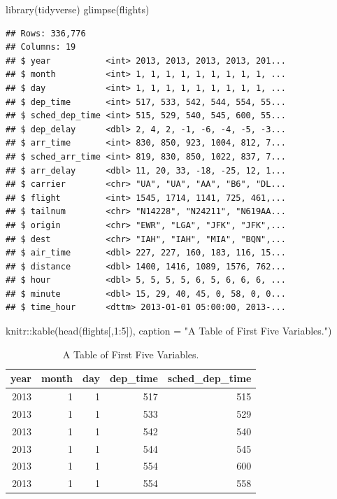 \documentclass[
]{book}
\newenvironment{Shaded}{\begin{snugshade}}{\end{snugshade}}
\newcommand{\AttributeTok}[1]{\textcolor[rgb]{0.77,0.63,0.00}{#1}}
\newcommand{\DecValTok}[1]{\textcolor[rgb]{0.00,0.00,0.81}{#1}}
\newcommand{\FunctionTok}[1]{\textcolor[rgb]{0.00,0.00,0.00}{#1}}
\newcommand{\NormalTok}[1]{#1}
\newcommand{\SpecialCharTok}[1]{\textcolor[rgb]{0.00,0.00,0.00}{#1}}
\newcommand{\StringTok}[1]{\textcolor[rgb]{0.31,0.60,0.02}{#1}}
\begin{document}
\begin{Shaded}
\begin{Highlighting}[]
\FunctionTok{library}\NormalTok{(tidyverse)}
\FunctionTok{glimpse}\NormalTok{(flights)}
\end{Highlighting}
\end{Shaded}

\begin{verbatim}
## Rows: 336,776
## Columns: 19
## $ year           <int> 2013, 2013, 2013, 2013, 201...
## $ month          <int> 1, 1, 1, 1, 1, 1, 1, 1, 1, ...
## $ day            <int> 1, 1, 1, 1, 1, 1, 1, 1, 1, ...
## $ dep_time       <int> 517, 533, 542, 544, 554, 55...
## $ sched_dep_time <int> 515, 529, 540, 545, 600, 55...
## $ dep_delay      <dbl> 2, 4, 2, -1, -6, -4, -5, -3...
## $ arr_time       <int> 830, 850, 923, 1004, 812, 7...
## $ sched_arr_time <int> 819, 830, 850, 1022, 837, 7...
## $ arr_delay      <dbl> 11, 20, 33, -18, -25, 12, 1...
## $ carrier        <chr> "UA", "UA", "AA", "B6", "DL...
## $ flight         <int> 1545, 1714, 1141, 725, 461,...
## $ tailnum        <chr> "N14228", "N24211", "N619AA...
## $ origin         <chr> "EWR", "LGA", "JFK", "JFK",...
## $ dest           <chr> "IAH", "IAH", "MIA", "BQN",...
## $ air_time       <dbl> 227, 227, 160, 183, 116, 15...
## $ distance       <dbl> 1400, 1416, 1089, 1576, 762...
## $ hour           <dbl> 5, 5, 5, 5, 6, 5, 6, 6, 6, ...
## $ minute         <dbl> 15, 29, 40, 45, 0, 58, 0, 0...
## $ time_hour      <dttm> 2013-01-01 05:00:00, 2013-...
\end{verbatim}

\begin{Shaded}
\begin{Highlighting}[]
\NormalTok{knitr}\SpecialCharTok{::}\FunctionTok{kable}\NormalTok{(}\FunctionTok{head}\NormalTok{(flights[,}\DecValTok{1}\SpecialCharTok{:}\DecValTok{5}\NormalTok{]), }\AttributeTok{caption =} \StringTok{"A Table of First Five Variables."}\NormalTok{)}
\end{Highlighting}
\end{Shaded}

\begin{table}

\caption{\label{tab:tab1}A Table of First Five Variables.}
\centering
\begin{tabular}[t]{r|r|r|r|r}
\hline
year & month & day & dep\_time & sched\_dep\_time\\
\hline
2013 & 1 & 1 & 517 & 515\\
\hline
2013 & 1 & 1 & 533 & 529\\
\hline
2013 & 1 & 1 & 542 & 540\\
\hline
2013 & 1 & 1 & 544 & 545\\
\hline
2013 & 1 & 1 & 554 & 600\\
\hline
2013 & 1 & 1 & 554 & 558\\
\hline
\end{tabular}
\end{table}
\end{document}
